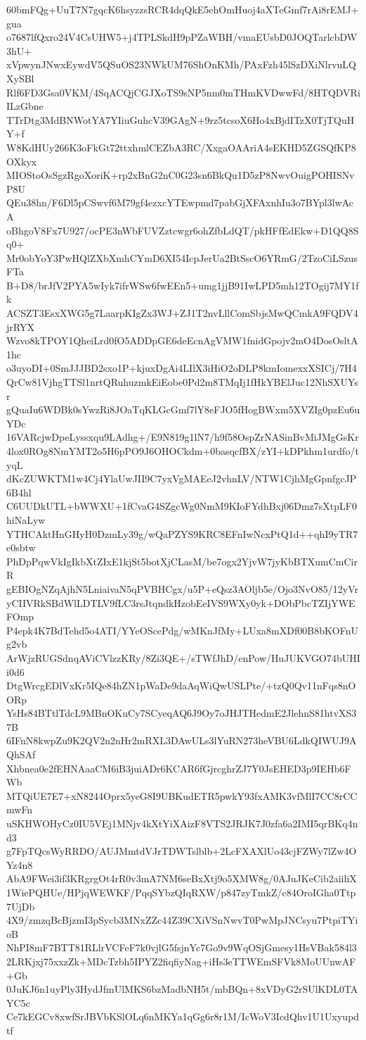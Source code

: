 60bmFQg+UuT7N7gqcK6hsyzzsRCR4dqQkE5ehOmHuoj4aXTeGmf7rAi8rEMJ+gua
o7687lfQxro24V4CsUHW5+j4TPLSkdH9pPZaWBH/vmaEUsbD0JOQTarlcbDW3hU+
xVpwynJNwxEywdV5QSuOS23NWkUM76ShOnKMh/PAxFzh45lSzDXiNlrvuLQXySBl
Rlf6FD3Gsa0VKM/4SqACQjCGJXoTS9sNP5nm0mTHmKVDwwFd/8HTQDVRiILzGbne
TTrDtg3MdBNWotYA7YIiuGuhcV39GAgN+9rz5tcsoX6Ho4xBjdITzX0TjTQuHY+f
W8KdHUy266K3oFkGt72ttxhmlCEZbA3RC/XxgaOAAriA4sEKHD5ZGSQfKP8OXkyx
MIOStoOsSgzRgoXoriK+rp2xBnG2nC0G23sn6BkQu1D5zP8NwvOuigPOHISNvP8U
QEu38hn/F6Dl5pCSwvf6M79gf4ezxcYTEwpmd7pabGjXFAxnhIu3o7BYpl3lwAcA
oBhgoV8Fx7U927/ocPE3nWbFUVZztcwgr6ohZfbLdQT/pkHFfEdEkw+D1QQ8Sq0+
Mr0obYoY3PwHQlZXbXmhCYmD6XI54IcpJerUa2BtSscO6YRmG/2TzoCiLSzusFTa
B+D8/brJfV2PYA5wIyk7ifrWSw6fwEEn5+umg1jjB91IwLPD5mh12TOgij7MY1fk
ACSZT3EsxXWG5g7LaarpKIgZx3WJ+ZJ1T2nvLllComSbjsMwQCmkA9FQDV4jrRYX
Wzvo8kTPOY1QheiLrd0fO5ADDpGE6deEcnAgVMW1fnidGpojv2mO4DosOsltA1hc
o3uyoDI+0SmJJJBD2sxo1P+kjuxDgAi4LIlX3iHiO2oDLP8kmIomexxXSICj/7H4
QrCw81VjhgTTSl1nrtQRuhuzmkEiEobe0Pd2m8TMqIj1fHkYBElJuc12NhSXUYsr
gQuaIu6WDBk0sYwzRi8JOaTqKLGcGmf7lY8eFJO5fHogBWxm5XVZIg0pzEu6uYDc
16VARcjwDpeLyssxqu9LAdhg+/E9N819g1lN7/h9f58OspZrNASinBvMiJMgGsKr
4lox0ROg8NmYMT2o5H6pPO9J6OHOCkdm+0basqcfBX/zYI+kDPkhm1urdfo/tyqL
dKcZUWKTM1w4Cj4YlaUwJII9C7yxVgMAEeJ2vhnLV/NTW1CjhMgGpnfgcJP6B4hl
C6UUDkUTL+bWWXU+1fCvaG4SZgcWg0NmM9KIoFYdhBxj06Dmz7sXtpLF0hiNaLyw
YTHCAktHnGHyH0DzmLy39g/wQaPZYS9KRC8EFnIwNcxPtQ1d++qhI9yTR7e0sbtw
PhDpPqwVkIgIkbXtZIxE1kjSt5botXjCLasM/be7ogx2YjvW7jyKbBTXumCmCirR
gEBIOgNZqAjhN5LniaivaN5qPVBHCgx/u5P+eQsz3AOljb5e/Ojo3NvO85/12yVr
yCIIVRkSBdWlLDTLV9fLC3rsJtqndkHzobEeIVS9WXy0yk+DObPbcTZIjYWEFOmp
P4epk4K7BdTehd5o4ATI/YYeOScePdg/wMKnJfMy+LUxa8mXDf00B8bKOFnUg2vb
ArWjzRUGSdnqAViCVlzzKRy/8Zi3QE+/sTWfJhD/enPow/HuJUKVGO74bUHIi0d6
DtgWrcgEDlVxKr5IQe84hZN1pWaDe9daAqWiQwUSLPte/+tzQ0Qv11nFqs8nOORp
YsHs84BTtlTdcL9MBnOKuCy7SCyeqAQ6J9Oy7oJHJTHedmE2JlehnS81htvXS37B
6IFnN8kwpZu9K2QV2n2nHr2mRXL3DAwULs3lYuRN273heVBU6LdkQIWUJ9AQhSAf
Xhbnea0e2fEHNAaaCM6iB3juiADr6KCAR6fGjrcghrZJ7Y0JsEHED3p9IEHb6FWb
MTQiUE7E7+xN8244Oprx5yeG8I9UBKudETR5pwkY93fxAMK3vfMlI7CC8rCCmwFn
uSKHWOHyCz0IU5VEj1MNjv4kXtYiXAizF8VTS2JRJK7J0zfa6a2IMI5qrBKq4nd3
g7FpTQcsWyRRDO/AUJMmtdVJrTDWTslblb+2LcFXAXlUo43cjFZWy7lZw4OYz4n8
AbA9FWei3if3KRgrgOt4rR0v3mA7NM6seBxXtj9o5XMW8g/0AJuJKeCib2aiiliX
1WiePQHUe/HPjqWEWKF/PqqSYbzQIqRXW/p847zyTmkZ/c84OroIGha0Ttp7UjDb
4X9/zmzqBcBjzmI3pSycb3MNxZZc44Z39CXiVSnNwvT0PwMpJNCsyu7PtpiTYioB
NhPI8mF7BTT81RLlrVCFeF7k0vjlG5fsjnYc7Go9v9WqOSjGmesy1HsVBak584l3
2LRKjxj75xxzZk+MDcTzbh5IPYZ2fiqfiyNag+iHs3eTTWEmSFVk8MoUUnwAF+Gb
0JuKJ6n1uyPly3HydJfmUlMKS6bzMadbNH5t/mbBQn+8xVDyG2rSUlKDL0TAYC5c
Ce7kEGCv8xwfSrJBVbKSlOLq6nMKYa1qGg6r8r1M/IcWoV3IcdQhv1U1Uxyupdtf
